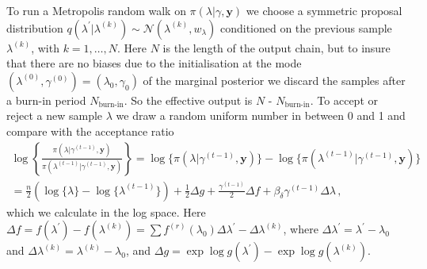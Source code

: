 To run a Metropolis random walk on $\pi(\lambda | \gamma, \bm{y}) $ we choose a symmetric proposal distribution $q(\lambda^\prime|\lambda^{(k)}) \sim \mathcal{N}(\lambda^{(k)}, w_\lambda)$ conditioned on the previous sample $\lambda^{(k)}$, with $k = 1 , \dots, N$.
Here $N$ is the length of the output chain, but to insure that there are no biases due to the initialisation at the mode $( \lambda^{(0)} , \gamma^{(0)}  ) = ( \lambda_{0} , \gamma_{0}  )$  of the marginal posterior we discard the samples after a burn-in period $N_{\text{burn-in}}$.
So the effective output is  $N$ - $N_{\text{burn-in}}$.
To accept or reject a new sample $\lambda$ we draw a random uniform number in between 0 and 1 and compare with the acceptance ratio
\begin{align} 
	\log \left\{ \frac{\pi(\lambda | \gamma^{(t-1)}, \bm{y})  }{\pi(\lambda^{(t-1)}| \gamma^{(t-1)}, \bm{y})}  \right\} 
	= \log  \{\pi(\lambda | \gamma^{(t-1)}, \bm{y} ) \}  -\log  \{ \pi(\lambda^{(t-1)}| \gamma^{(t-1)}, \bm{y}) \} \\
	= \frac{n}{2} (\log\{\lambda\} - \log\{\lambda^{(t-1)}\} ) + \frac{1}{2} \Delta g + \frac{\gamma^{(t-1)}}{2} \Delta f  + \beta_\delta \gamma^{(t-1)} \Delta \lambda  \, ,
\end{align}
which we calculate in the log space.
Here $\Delta f = f(\lambda^\prime) - f(\lambda^{(k)}) = \sum f^{(r)} (\lambda_0)\Delta \lambda^\prime - \Delta \lambda^{(k)} $, where $\Delta \lambda^\prime = \lambda^\prime - \lambda_0 $ and $\Delta \lambda^{(k)} =  \lambda^{(k)} - \lambda_0$, and $\Delta g = \exp{\log{g(\lambda^{\prime})}} - \exp{\log{g(\lambda^{(k)})}}$.



